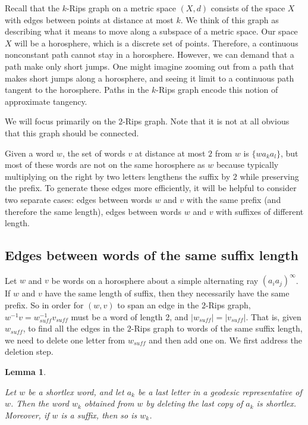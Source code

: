 \documentclass{amsart}
\newtheorem{lemma}[theorem]{Lemma}
\theoremstyle{definition}
\theoremstyle{remark}
\begin{document}
	Recall that the $k$-Rips graph on a metric space $(X,d)$ consists of the space $X$ with edges between points at distance at most $k$. We think of this graph as describing what it means to move along a subspace of a metric space. Our space $X$ will be a horosphere, which is a discrete set of points. Therefore, a continuous nonconstant path cannot stay in a horosphere. However, we can demand that a path make only short jumps. One might imagine zooming out from a path that makes short jumps along a horosphere, and seeing it limit to a continuous path tangent to the horosphere. Paths in the $k$-Rips graph encode this notion of approximate tangency.
	
	We will focus primarily on the $2$-Rips graph. Note that it is not at all obvious that this graph should be connected.
	
	Given a word $w$, the set of words $v$ at distance at most $2$ from $w$ is $\{wa_ka_l\}$, but most of these words are not on the same horosphere as $w$ because typically multiplying on the right by two letters lengthens the suffix by $2$ while preserving the prefix. To generate these edges more efficiently, it will be helpful to consider two separate cases: edges between words $w$ and $v$ with the same prefix (and therefore the same length), edges between words $w$ and $v$ with suffixes of different length.  
	
	\subsection{Edges between words of the same suffix length} 
	\label{subsec:RipsEdgesSameLength}
        
	Let $w$ and $v$ be words on a horosphere about a simple alternating ray $(a_ia_j)^\infty$. If $w$ and $v$ have the same length of suffix, then they necessarily have the same prefix. So in order for $(w,v)$ to span an edge in the $2$-Rips graph, $w^{-1}v=w_{suff}^{-1}v_{suff}$ must be a word of length 2, and $|w_{suff}|=|v_{suff}|$. That is, given $w_{suff}$, to find all the edges in the $2$-Rips graph to words of the same suffix length, we need to delete one letter from $w_{suff}$ and then add one on. We first address the deletion step.
	
	\begin{lemma} \label{DeletionPreservesShortlexSuffixes}
		
		Let $w$ be a shortlex word, and let $a_k$ be a last letter in a geodesic representative of $w$. Then the word $w_k$ obtained from $w$ by deleting the last copy of $a_k$ is shortlex. Moreover, if $w$ is a suffix, then so is $w_k$.
		
	\end{lemma}
	
\end{document}
